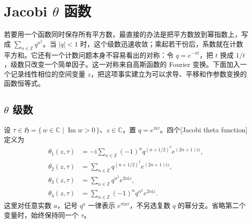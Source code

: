 \section{Jacobi \texorpdfstring{\(\theta\)}{\AnalysisPdfTheta} 函数}
\label{b3:sec:2401}

若要用一个函数同时保存所有平方数，最直接的办法是把平方数放到幂指数上，写成 \(\sum_{n\in\mathbb Z}q^{n^2}\)。当 \(|q|<1\) 时，这个级数迅速收敛；乘起若干份后，系数就在计数平方和。它还有一个计数问题本身不容易看出的对称：令 \(q=e^{-\pi t}\)，把 \(t\) 换成 \(1/t\)，级数只改变一个简单因子。这一对称来自高斯函数的 Fourier 变换。下面加入一个记录线性相位的空间变量 \(z\)，把这项事实建立为可以求导、平移和作参数变换的函数恒等式。

\subsection{\texorpdfstring{\(\theta\)}{\AnalysisPdfTheta} 级数}
\label{b3:subsec:240101}

\begin{definition}\label{b3:def:24-theta-series}
设 \(\tau\in\mathfrak H=\{\,w\in\mathbb C\mid\operatorname{Im}w>0\,\}\)、\(z\in\mathbb C\)，置 \(q=e^{\pi\mathrm i\tau}\)。四个[Jacobi theta function]定义为
\begin{equation}\label{b3:eq:24-theta-series}
\begin{aligned}
 \theta_1(z,\tau)&=-\mathrm i\sum_{n\in\mathbb Z}(-1)^n
                q^{(n+1/2)^2}e^{(2n+1)\mathrm iz},\\
 \theta_2(z,\tau)&=\sum_{n\in\mathbb Z}
                q^{(n+1/2)^2}e^{(2n+1)\mathrm iz},\\
 \theta_3(z,\tau)&=\sum_{n\in\mathbb Z}q^{n^2}e^{2n\mathrm iz},\\
 \theta_4(z,\tau)&=\sum_{n\in\mathbb Z}(-1)^nq^{n^2}e^{2n\mathrm iz}.
\end{aligned}
\end{equation}
这里对任意实数 \(a\)，记号 \(q^a\) 一律表示 \(e^{\pi\mathrm i a\tau}\)，不另选复数 \(q\) 的幂分支。省略第二个变量时，始终保持同一个 \(\tau\)。
\end{definition}

